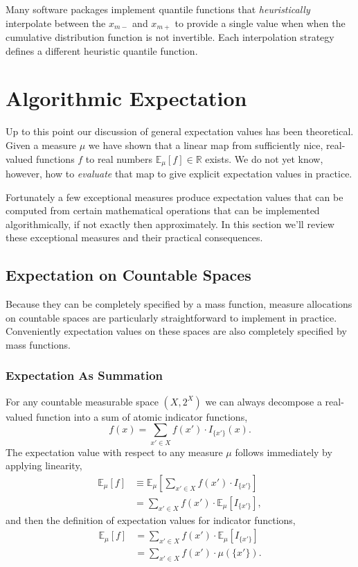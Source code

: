 \documentclass[
  letterpaper,
  DIV=11,
  numbers=noendperiod]{scrartcl}
\begin{document}
Many software packages implement quantile functions that
\emph{heuristically} interpolate between the \(x_{m-}\) and \(x_{m+}\)
to provide a single value when when the cumulative distribution function
is not invertible. Each interpolation strategy defines a different
heuristic quantile function.

\hypertarget{algorithmic-expectation}{%
\section{Algorithmic Expectation}\label{algorithmic-expectation}}

Up to this point our discussion of general expectation values has been
theoretical. Given a measure \(\mu\) we have shown that a linear map
from sufficiently nice, real-valued functions \(f\) to real numbers
\(\mathbb{E}_{\mu}[f] \in \mathbb{R}\) exists. We do not yet know,
however, how to \emph{evaluate} that map to give explicit expectation
values in practice.

Fortunately a few exceptional measures produce expectation values that
can be computed from certain mathematical operations that can be
implemented algorithmically, if not exactly then approximately. In this
section we'll review these exceptional measures and their practical
consequences.

\hypertarget{expectation-on-countable-spaces}{%
\subsection{Expectation on Countable
Spaces}\label{expectation-on-countable-spaces}}

Because they can be completely specified by a mass function, measure
allocations on countable spaces are particularly straightforward to
implement in practice. Conveniently expectation values on these spaces
are also completely specified by mass functions.

\hypertarget{expectation-as-summation}{%
\subsubsection{Expectation As
Summation}\label{expectation-as-summation}}

For any countable measurable space \((X, 2^{X})\) we can always
decompose a real-valued function into a sum of atomic indicator
functions, \[
f(x) = \sum_{x' \in X} f(x') \cdot I_{ \{ x' \} }(x).
\] The expectation value with respect to any measure \(\mu\) follows
immediately by applying linearity, \begin{align*}
\mathbb{E}_{\mu}[f]
&\equiv
\mathbb{E}_{\mu} \left[ \sum_{x' \in X} f(x') \cdot I_{ \{ x' \} } \right]
\\
&=
\sum_{x' \in X} f(x') \cdot
\mathbb{E}_{\mu} \left[ I_{ \{ x' \} } \right],
\end{align*} and then the definition of expectation values for indicator
functions, \begin{align*}
\mathbb{E}_{\mu}[f]
&=
\sum_{x' \in X} f(x') \cdot
\mathbb{E}_{\mu} \left[ I_{ \{ x' \} } \right]
\\
&=
\sum_{x' \in X} f(x') \cdot \mu( \{ x' \} ).
\end{align*}
\end{document}
